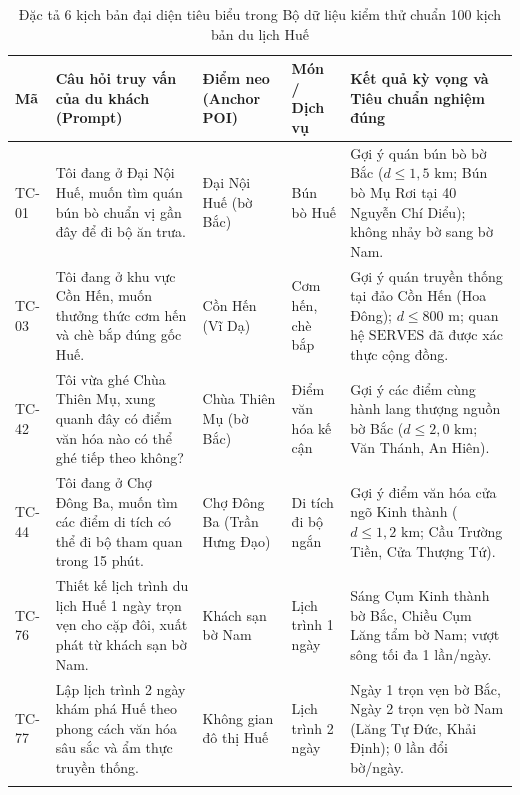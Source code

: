 \begin{table}[htbp]
\centering
\caption{Đặc tả 6 kịch bản đại diện tiêu biểu trong Bộ dữ liệu kiểm thử chuẩn 100 kịch bản du lịch Huế}
\label{tab:benchmark-suite-specs}
\footnotesize
\singlespacing
\renewcommand{\arraystretch}{1.1}
\begin{tabularx}{\textwidth}{>{\centering\arraybackslash}p{1.0cm} >{\raggedright\arraybackslash}p{3.8cm} >{\raggedright\arraybackslash}p{2.2cm} >{\raggedright\arraybackslash}p{2.0cm} >{\raggedright\arraybackslash}X}
\hline
\textbf{Mã} & \textbf{Câu hỏi truy vấn của du khách (Prompt)} & \textbf{Điểm neo (Anchor POI)} & \textbf{Món / Dịch vụ} & \textbf{Kết quả kỳ vọng và Tiêu chuẩn nghiệm đúng} \\
\hline
TC-01 & Tôi đang ở Đại Nội Huế, muốn tìm quán bún bò chuẩn vị gần đây để đi bộ ăn trưa. & Đại Nội Huế (bờ Bắc) & Bún bò Huế & Gợi ý quán bún bò bờ Bắc ($d \le 1{,}5\text{ km}$; Bún bò Mụ Rơi tại 40 Nguyễn Chí Diểu); không nhảy bờ sang bờ Nam. \\
TC-03 & Tôi đang ở khu vực Cồn Hến, muốn thưởng thức cơm hến và chè bắp đúng gốc Huế. & Cồn Hến (Vĩ Dạ) & Cơm hến, chè bắp & Gợi ý quán truyền thống tại đảo Cồn Hến (Hoa Đông); $d \le 800\text{ m}$; quan hệ $\text{SERVES}$ đã được xác thực cộng đồng. \\
\hline
TC-42 & Tôi vừa ghé Chùa Thiên Mụ, xung quanh đây có điểm văn hóa nào có thể ghé tiếp theo không? & Chùa Thiên Mụ (bờ Bắc) & Điểm văn hóa kế cận & Gợi ý các điểm cùng hành lang thượng nguồn bờ Bắc ($d \le 2{,}0\text{ km}$; Văn Thánh, An Hiên). \\
TC-44 & Tôi đang ở Chợ Đông Ba, muốn tìm các điểm di tích có thể đi bộ tham quan trong 15 phút. & Chợ Đông Ba (Trần Hưng Đạo) & Di tích đi bộ ngắn & Gợi ý điểm văn hóa cửa ngõ Kinh thành ($d \le 1{,}2\text{ km}$; Cầu Trường Tiền, Cửa Thượng Tứ). \\
\hline
TC-76 & Thiết kế lịch trình du lịch Huế 1 ngày trọn vẹn cho cặp đôi, xuất phát từ khách sạn bờ Nam. & Khách sạn bờ Nam & Lịch trình 1 ngày & Sáng Cụm Kinh thành bờ Bắc, Chiều Cụm Lăng tẩm bờ Nam; vượt sông tối đa 1 lần/ngày. \\
TC-77 & Lập lịch trình 2 ngày khám phá Huế theo phong cách văn hóa sâu sắc và ẩm thực truyền thống. & Không gian đô thị Huế & Lịch trình 2 ngày & Ngày 1 trọn vẹn bờ Bắc, Ngày 2 trọn vẹn bờ Nam (Lăng Tự Đức, Khải Định); 0 lần đổi bờ/ngày. \\
\hline
\multicolumn{5}{l}{\footnotesize \textit{Ghi chú:} Toàn văn đặc tả chi tiết 100 kịch bản kiểm thử chuẩn được cung cấp tại Phụ lục A.}
\end{tabularx}
\end{table}

